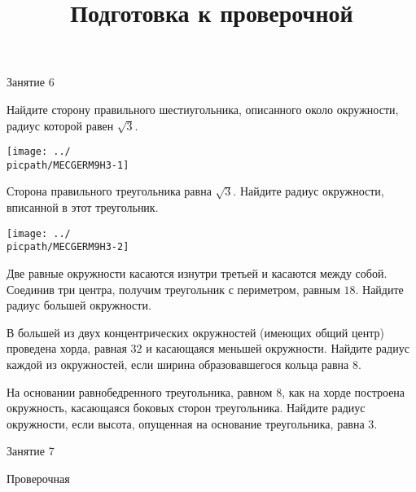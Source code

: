 \begin{class}[number=6]
	\begin{listofex}
		\item Занятие 6
	\end{listofex}
\end{class}

\begin{homework}[number=3]
	\begin{listofex}
		\item
		\begin{minipage}[t]{\bodywidth}
			Найдите сторону правильного шестиугольника, описанного около окружности, радиус которой равен \(\sqrt{3}\).
		\end{minipage}
		\hspace{0.02\linewidth}
		\begin{minipage}[t]{\picwidth}
			\texttt{[image: ../\\picpath/MECGERM9H3-1]}
		\end{minipage}
		\item
		\begin{minipage}[t]{\bodywidth}
			Сторона правильного треугольника равна \(\sqrt{3}\). Найдите радиус окружности, вписанной в этот треугольник.
		\end{minipage}
		\hspace{0.02\linewidth}
		\begin{minipage}[t]{\picwidth}
			\texttt{[image: ../\\picpath/MECGERM9H3-2]}
		\end{minipage}
		\item Две равные окружности касаются изнутри третьей и касаются
		между собой. Соединив три центра, получим треугольник с периметром, равным \(18\). Найдите радиус большей окружности.
		\item В большей из двух концентрических окружностей (имеющих общий центр) проведена хорда, равная \(32\) и касающаяся меньшей окружности. Найдите радиус каждой из окружностей, если ширина образовавшегося кольца равна \(8\).
		\item На основании равнобедренного треугольника, равном \(8\), как на хорде построена окружность, касающаяся боковых сторон треугольника. Найдите радиус окружности, если высота, опущенная на основание треугольника, равна \(3\).
	\end{listofex}
\end{homework}

\begin{class}[number=7]
	\title{Подготовка к проверочной}
	\begin{listofex}
		\item Занятие 7
	\end{listofex}
\end{class}

\begin{exam}
	\begin{listofex}
		\item Проверочная
	\end{listofex}
\end{exam}
